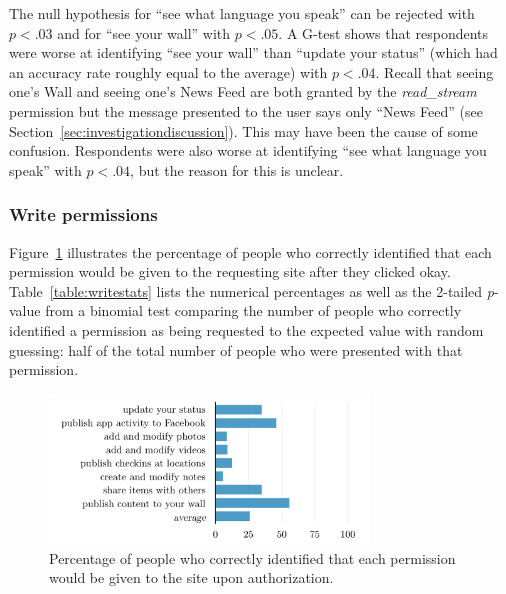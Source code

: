 \documentclass[10pt]{sig-alternate-10pt}
\begin{document}
The null hypothesis for ``see what language you speak'' can be rejected with $p < .03$ and for ``see your wall'' with $p < .05$. A G-test shows that respondents were worse at identifying ``see your wall'' than ``update your status'' (which had an accuracy rate roughly equal to the average) with $p < .04$. Recall that seeing one's Wall and seeing one's News Feed are both granted by the \emph{read\_stream} permission but the message presented to the user says only ``News Feed'' (see Section~\ref{sec:investigationdiscussion}). This may have been the cause of some confusion. Respondents were also worse at identifying ``see what language you speak'' with $p < .04$, but the reason for this is unclear.

\subsubsection{Write permissions}

Figure~\ref{figure:writepercents} illustrates the percentage of people who correctly identified that each permission would be given to the requesting site after they clicked okay. Table~\ref{table:writestats} lists the numerical percentages as well as the 2-tailed \emph{p}-value from a binomial test comparing the number of people who correctly identified a permission as being requested to the expected value with random guessing: half of the total number of people who were presented with that permission.

\begin{figure}[h!]
  \centering
  \includegraphics[width=8.5cm]{write_percents_cosn}
  \caption{Percentage of people who correctly identified that each permission would be given to the site upon authorization.}
  \label{figure:writepercents}
\end{figure}
\end{document}
